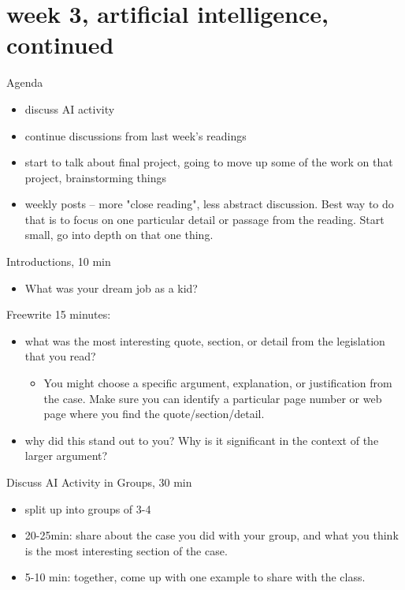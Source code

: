 \documentclass[11pt]{article}
\author{fcalado}
\date{\today}
\title{}
\begin{document}
\tableofcontents

\section{week 3, artificial intelligence, continued}
\label{sec:orgd435a0b}
Agenda
\begin{itemize}
\item discuss AI activity
\item continue discussions from last week's readings
\item start to talk about final project, going to move up some of the work
on that project, brainstorming things
\item weekly posts -- more "close reading", less abstract discussion. Best
way to do that is to focus on one particular detail or passage from
the reading. Start small, go into depth on that one thing.
\end{itemize}

Introductions, 10 min
\begin{itemize}
\item What was your dream job as a kid?
\end{itemize}

Freewrite 15 minutes:
\begin{itemize}
\item what was the most interesting quote, section, or detail from the
legislation that you read?
\begin{itemize}
\item You might choose a specific argument, explanation, or
justification from the case. Make sure you can identify a
particular page number or web page where you find the
quote/section/detail.
\end{itemize}
\item why did this stand out to you? Why is it significant in the context
of the larger argument?
\end{itemize}

Discuss AI Activity in Groups, 30 min
\begin{itemize}
\item split up into groups of 3-4
\item 20-25min: share about the case you did with your group, and what you
think is the most interesting section of the case.

\item 5-10 min: together, come up with one example to share with the
class.
\end{itemize}
\end{document}
